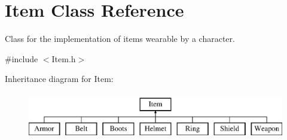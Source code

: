 \hypertarget{class_item}{}\section{Item Class Reference}
\label{class_item}


Class for the implementation of items wearable by a character.  




{\ttfamily \#include $<$Item.\+h$>$}

Inheritance diagram for Item\+:\begin{figure}[H]
\begin{center}
\leavevmode
\includegraphics[height=2.000000cm]{class_item}
\end{center}
\end{figure}
